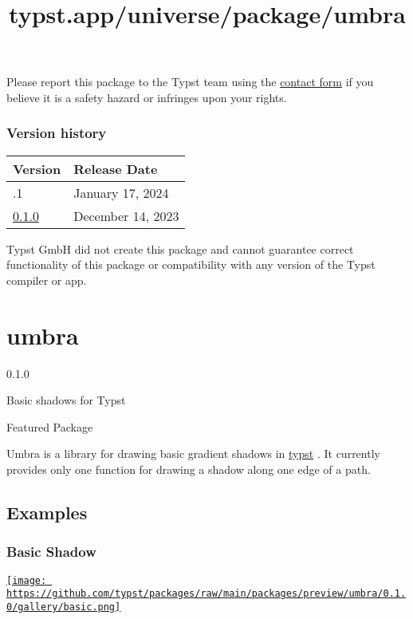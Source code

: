Please report this package to the Typst team using the
\href{https://typst.app/contact}{contact form} if you believe it is a
safety hazard or infringes upon your rights.

\label{versions}
\subsubsection{Version history}\label{version-history}

\begin{longtable}[]{@{}ll@{}}
\toprule\noalign{}
Version & Release Date \\
\midrule\noalign{}
\endhead
\bottomrule\noalign{}
\endlastfoot
0.1.1 & January 17, 2024 \\
\href{https://typst.app/universe/package/m-jaxon/0.1.0/}{0.1.0} &
December 14, 2023 \\
\end{longtable}

Typst GmbH did not create this package and cannot guarantee correct
functionality of this package or compatibility with any version of the
Typst compiler or app.


\title{typst.app/universe/package/umbra}

\label{banner}
\section{umbra}\label{umbra}

{ 0.1.0 }

Basic shadows for Typst

{ } Featured Package

\label{readme}
Umbra is a library for drawing basic gradient shadows in
\href{https://typst.app/}{typst} . It currently provides only one
function for drawing a shadow along one edge of a path.

\subsection{Examples}\label{examples}

\subsubsection{Basic Shadow}\label{basic-shadow}

\href{https://github.com/typst/packages/raw/main/packages/preview/umbra/0.1.0/gallery/basic.typ}{\texttt{[image: https://github.com/typst/packages/raw/main/packages/preview/umbra/0.1.0/gallery/basic.png]}}

